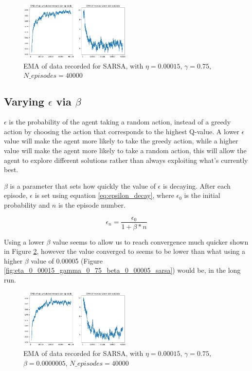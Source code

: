 \documentclass[conference]{IEEEtran}
\begin{document}
\begin{figure}[htbp]
\centerline{\includegraphics[width=0.5\textwidth]{images/eta_0_00015_gamma_0_75_sarsa.png}}
\caption{EMA of data recorded for SARSA, with $\eta=0.00015$, $\gamma=0.75$, $N\_episodes=40000$}
\label{fig:eta_0_00015_gamma_0_75_sarsa}
\end{figure}

\subsection{Varying $\epsilon$ via $\beta$}
$\epsilon$ is the probability of the agent taking a random action, instead of a greedy action by choosing the action that corresponds to the highest Q-value. A lower $\epsilon$ value will make the agent more likely to take the greedy action, while a higher value will make the agent more likely to take a random action, this will allow the agent to explore different solutions rather than always exploiting what's currently best.

$\beta$ is a parameter that sets how quickly the value of $\epsilon$ is decaying. After each episode, $\epsilon$ is set using equation \ref{eq:epsilon_decay}, where $\epsilon_0$ is the initial probability and $n$ is the episode number.

\begin{equation}\label{eq:epsilon_decay}
    \epsilon_n = \frac{\epsilon_0}{1 + \beta * n}
\end{equation}

Using a lower $\beta$ value seems to allow us to reach convergence much quicker shown in Figure \ref{fig:eta_0_00015_gamma_0_75_beta_0_0000005_sarsa}, however the value converged to seems to be lower than what using a higher $\beta$ value of 0.00005 (Figure \ref{fig:eta_0_00015_gamma_0_75_beta_0_00005_sarsa}) would be, in the long run.

\begin{figure}[htbp]
\centerline{\includegraphics[width=0.5\textwidth]{images/eta_0_00015_gamma_0_75_beta_0_0000005_sarsa.png}}
\caption{EMA of data recorded for SARSA, with $\eta=0.00015$, $\gamma=0.75$, $\beta=0.0000005$, $N\_episodes=40000$}
\label{fig:eta_0_00015_gamma_0_75_beta_0_0000005_sarsa}
\end{figure}
\end{document}
